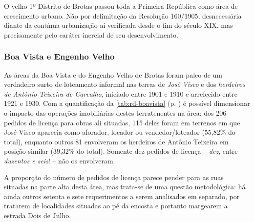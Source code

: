 
O velho 1º Distrito de Brotas passou toda a Primeira República como área de crescimento urbano. Não por delimitação da Resolução 160/1905, desnecessária diante da contínua urbanização aí verificada desde o fim do século XIX, mas precisamente pelo caráter inercial de seu desenvolvimento. 

\subsubsection{Boa Vista e Engenho Velho}


As áreas da Boa Vista e do Engenho Velho de Brotas foram palco de um verdadeiro surto de loteamento informal nas terras de \textit{José Visco} e dos \textit{herdeiros de Antônio Teixeira de Carvalho}, iniciado entre 1901 e 1910 e arrefecido entre 1921 e 1930. Com a quantificação da \autoref{tab:rd-boavista} (p. \pageref{tab:rd-boavista}) é possível dimensionar o impacto das operações imobiliárias destes terratenentes na área: dos 206 pedidos de licença para obras ali situadas, 115 deles foram em terrenos em que José Visco aparecia como aforador, locador ou vendedor/loteador (55,82\% do total), enquanto outros 81 envolveram os herdeiros de Antônio Teixeira em posição similar (39,32\% do total). Somente dez pedidos de licença – \textit{dez}, entre \textit{duzentos e seis}! – não os envolveram.





A proporção do número de pedidos de licença parece pender para as ruas situadas na parte alta desta área, mas trata-se de uma questão metodológica: há ainda outros setenta e sete requerimentos a serem analisados em separado, por tratarem de localidades situadas ao pé da encosta e portanto margearem a estrada Dois de Julho.


